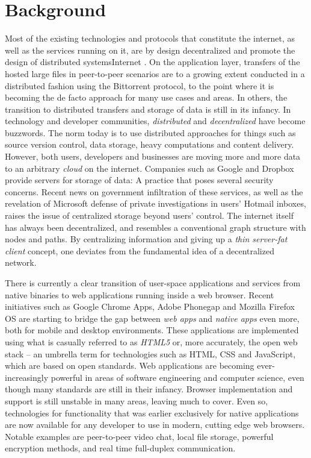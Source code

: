 \section{Background}
Most of the existing technologies and protocols that constitute the internet, as well as the services running on it, are by design decentralized and promote the design of distributed systemsInternet \cite{InternetDecenterlized:Online}. On the application layer, transfers of the hosted large files in peer-to-peer scenarios are to a growing extent conducted in a distributed fashion using the Bittorrent protocol, to the point where it is becoming the de facto approach for many use cases and areas. In others, the transition to distributed transfers and storage of data is still in its infancy. In technology and developer communities, \emph{distributed} and \emph{decentralized} have become buzzwords. The norm today is to use distributed approaches for things such as source version control, data storage, heavy computations and content delivery.
However, both users, developers and businesses are moving more and more data to an arbitrary \emph{cloud} on the internet. Companies such as Google and Dropbox provide servers for storage of data: A practice that poses several security concerns. Recent news on government infiltration of these services, as well as the revelation of Microsoft  defense of private investigations in users' Hotmail inboxes, raises the issue of centralized storage beyond users' control. The internet itself has always been decentralized, and resembles a conventional graph structure with nodes and paths. By centralizing information and giving up a \emph{thin server-fat client} concept, one deviates from the fundamental idea of a decentralized network.

There is currently a clear transition of user-space applications and services from native binaries to web applications running inside a web browser. Recent initiatives such as Google Chrome Apps, Adobe Phonegap and Mozilla Firefox OS are starting to bridge the gap between \emph{web apps} and \emph{native apps} even more, both for mobile and desktop environments. These applications are implemented using what is casually referred to as \emph{HTML5} or, more accurately, the open web stack – an umbrella term for technologies such as HTML, CSS and JavaScript, which are based on open standards. Web applications are becoming ever-increasingly powerful in areas of software engineering and computer science, even though many standards are still in their infancy. Browser implementation and support is still unstable in many areas, leaving much to cover. Even so, technologies for functionality that was earlier exclusively for native applications are now available for any developer to use in modern, cutting edge web browsers. Notable examples are peer-to-peer video chat, local file storage, powerful encryption methods, and real time full-duplex communication.


